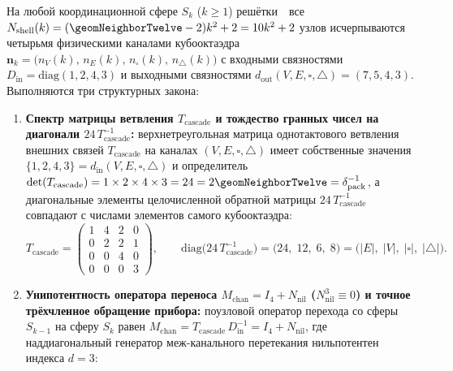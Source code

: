 \begin{theorem}
\label{thm:compute-cuboctahedral-19node-aperture-and-gas}
На любой координационной сфере $S_k$ ($k\ge 1$) решётки~\latGCKshort\ все $N_{\mathrm{shell}}(k) = (\geomNeighborTwelve - 2)k^2 + 2 = 10k^2 + 2$ узлов исчерпываются четырьмя физическими каналами кубооктаэдра $\mathbf{n}_k = \bigl(n_V(k),\,n_E(k),\,n_\square(k),\,n_\triangle(k)\bigr)$ с входными связностями $D_{\mathrm{in}} = \mathrm{diag}(1,2,4,3)$ и выходными связностями $d_{\mathrm{out}}(V,E,\square,\triangle) = (7,5,4,3)$. Выполняются три структурных закона:
\begin{enumerate}[leftmargin=*]
\item \textbf{Спектр матрицы ветвления $T_{\mathrm{cascade}}$ и тождество гранных чисел на диагонали $24\,T_{\mathrm{cascade}}^{-1}$:}
  верхнетреугольная матрица однотактового ветвления внешних связей $T_{\mathrm{cascade}}$ на каналах $(V,E,\square,\triangle)$ имеет собственные значения $\{1,2,4,3\} = d_{\mathrm{in}}(V,E,\square,\triangle)$ и определитель $\det(T_{\mathrm{cascade}}) = 1\times 2\times 4\times 3 = 24 = 2\geomNeighborTwelve = \delta_{\mathrm{pack}}^{-1}$, а диагональные элементы целочисленной обратной матрицы $24\,T_{\mathrm{cascade}}^{-1}$ совпадают с числами элементов самого кубооктаэдра:
  \begin{equation}
  \label{eq:compute-cascade-det-and-inverse}
    T_{\mathrm{cascade}} =
    \begin{pmatrix}
      1 & 4 & 2 & 0 \\
      0 & 2 & 2 & 1 \\
      0 & 0 & 4 & 0 \\
      0 & 0 & 0 & 3
    \end{pmatrix},
    \qquad
    \mathrm{diag}\bigl(24\,T_{\mathrm{cascade}}^{-1}\bigr)
    = \bigl(24,\; 12,\; 6,\; 8\bigr)
    = \bigl(|E|,\; |V|,\; |\square|,\; |\triangle|\bigr).
  \end{equation}
\item \textbf{Унипотентность оператора переноса $M_{\mathrm{chan}} = I_4 + N_{\mathrm{nil}}$ ($N_{\mathrm{nil}}^3 \equiv 0$) и точное трёхчленное обращение прибора:}
  поузловой оператор перехода со сферы $S_{k-1}$ на сферу $S_k$ равен $M_{\mathrm{chan}} = T_{\mathrm{cascade}}\,D_{\mathrm{in}}^{-1} = I_4 + N_{\mathrm{nil}}$, где наддиагональный генератор меж-канального перетекания нильпотентен индекса $d = 3$:
  \begin{equation}

\end{equation}
\end{enumerate}
\end{theorem}

